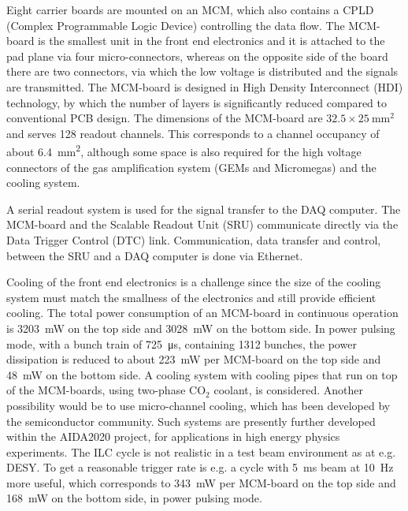 \noindent Eight carrier boards are mounted on an MCM, which also contains a CPLD (Complex Programmable Logic Device) controlling the data flow. The MCM-board is the smallest unit in the front end electronics and it is attached to the pad plane via four micro-connectors, whereas on the opposite side of the board there are two connectors, via which the low voltage is distributed and the signals are transmitted. The MCM-board is designed in High Density Interconnect (HDI) technology, by which the number of layers is significantly reduced compared to conventional PCB design. The dimensions of the MCM-board are $32.5 \times \SI{25}{\milli\meter\squared}$ and serves 128 readout channels. This corresponds to a channel occupancy of about \SI{6.4}{\mm\squared}, although some space is also required for the high voltage connectors of the gas amplification system (GEMs and Micromegas) and the cooling system.

\noindent A serial readout system is used for the signal transfer to the DAQ computer. The MCM-board and the Scalable Readout Unit (SRU) communicate directly via the Data Trigger Control (DTC) link. Communication, data transfer and control, between the SRU and a DAQ computer is done via Ethernet.

\noindent Cooling of the front end electronics is a challenge since the size of the cooling system must match the smallness of the electronics and still provide efficient cooling. The total power consumption of an MCM-board in continuous operation
is \SI{3203}{\milli\watt} on the top side and \SI{3028}{\milli\watt} on the bottom side. In power pulsing mode, with a bunch train of \SI{725}{\micro\s}, containing 1312 bunches, the power dissipation is reduced to about \SI{223}{\milli\watt} per MCM-board on the top side and \SI{48}{\milli\watt} on the bottom side. A cooling system with cooling pipes that run on top of the MCM-boards, using two-phase CO$_2$ coolant, is considered. Another possibility would be to use micro-channel cooling, which has been developed by the semiconductor community. Such systems are presently further developed within the AIDA2020 project, for applications in high energy physics experiments. The ILC cycle is not realistic in a test beam environment as at e.g. DESY. To get a reasonable trigger rate is e.g. a cycle with \SI{5}{\ms} beam at \SI{10}{\Hz} more useful, which corresponds to \SI{343}{\milli\watt} per MCM-board on the top side and \SI{168}{\milli\watt} on the bottom side, in power pulsing mode.

